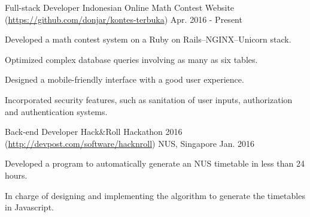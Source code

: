 

\begin{cventries}

	\cventry
	{Full-stack Developer} %
	{Indonesian Online Math Contest Website (\url{https://github.com/donjar/kontes-terbuka})} %
	{} %
	{Apr. 2016 - Present} %
	{
		\begin{cvitems} %
		\item {Developed a math contest system on a Ruby on Rails--NGINX--Unicorn stack.}
		\item {Optimized complex database queries involving as many as six tables.}
		\item {Designed a mobile-friendly interface with a good user experience.}
		\item {Incorporated security features, such as sanitation of user inputs, authorization and authentication systems.}
		\end{cvitems}
	}

	\cventry
	{Back-end Developer} %
	{Hack\&Roll Hackathon 2016 (\url{http://devpost.com/software/hacknroll})} %
	{NUS, Singapore} %
	{Jan. 2016} %
	{
		\begin{cvitems} %
		\item {Developed a program to automatically generate an NUS timetable in less than 24 hours.}
		\item {In charge of designing and implementing the algorithm to generate the timetables in Javascript.}
		\end{cvitems}
	}


\end{cventries}
